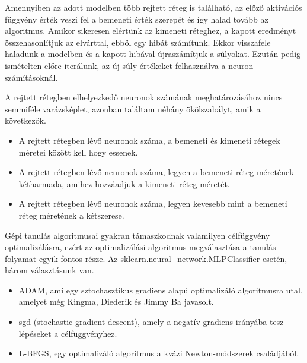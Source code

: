 Amennyiben az adott modelben több rejtett réteg is található, az előző aktivációs függvény érték veszi fel a bemeneti érték szerepét és így halad tovább az algoritmus. Amikor sikeresen elértünk az kimeneti réteghez, a kapott eredményt összehasonlítjuk az elvárttal, ebből egy hibát számítunk.
Ekkor visszafele haladunk a modelben és a kapott hibával újraszámítjuk a súlyokat.
Ezután pedig ismételten előre iterálunk, az új súly értékeket felhasználva a neuron számításoknál.

A rejtett rétegben elhelyezkedő neuronok számának meghatározásához nincs semmiféle varázsképlet, azonban találtam néhány ökölszabályt, amik a következők. 
\begin{itemize}
\item A rejtett rétegben lévő neuronok száma, a bemeneti és kimeneti rétegek méretei között kell hogy essenek.
\item A rejtett rétegben lévő neuronok száma, legyen a bemeneti réteg méretének kétharmada, amihez hozzáadjuk a kimeneti réteg méretét.
\item A rejtett rétegben lévő neuronok száma, legyen kevesebb mint a bemeneti réteg méretének a kétszerese.
\end{itemize}

Gépi tanulás algoritmusai gyakran támaszkodnak valamilyen célfüggvény optimalizálásra, ezért az optimalizálási algoritmus megválasztása a tanulás folyamat egyik fontos része.
Az sklearn.neural\_network.MLPClassifier esetén, három választásunk van.
\begin{itemize}
\item ADAM, ami egy sztochasztikus gradiens alapú optimalizáló algoritmusra utal, amelyet még Kingma, Diederik és Jimmy Ba javasolt.
\item sgd (stochastic gradient descent), amely a negatív gradiens irányába tesz lépéseket a célfüggvényhez.
\item L-BFGS, egy  optimalizáló algoritmus a kvázi Newton-módszerek családjából.

\end{itemize}

